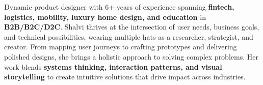 \documentclass[10pt,a4paper,ragged2e,withhyper]{altacv}
\begin{document}


\makecvheader

Dynamic product designer with 6+ years of experience spanning \textbf{fintech, logistics, mobility, luxury home design, and education} in \textbf{B2B/B2C/D2C}. Shalvi thrives at the intersection of user needs, business goals, and technical possibilities, wearing multiple hats as a researcher, strategist, and creator. From mapping user journeys to crafting prototypes and delivering polished designs, she brings a holistic approach to solving complex problems. 
Her work blends \textbf{systems thinking, interaction patterns, and visual storytelling} to create intuitive solutions that drive impact across industries.

\end{document}
